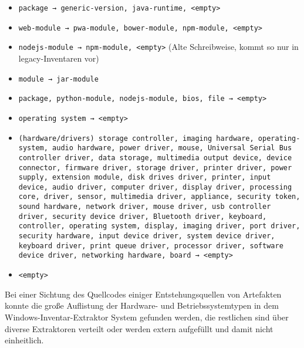 \begin{itemize}
    \itemsep0em

    \item \texttt{package → generic-version, java-runtime, <empty>}
    \item \texttt{web-module → pwa-module, bower-module, npm-module, <empty>}
    \item \texttt{nodejs-module → npm-module, <empty>} (Alte Schreibweise, kommt so nur in legacy-Inventaren vor)
    \item \texttt{module → jar-module}
    \item \texttt{package, python-module, nodejs-module, bios, file → <empty>}
    \item \texttt{operating system → <empty>}
    \item \texttt{(hardware/drivers) storage controller, imaging hardware, operating-system, audio hardware, power driver, mouse, Universal Serial Bus controller driver, data storage, multimedia output device, device connector, firmware driver, storage driver, printer driver, power supply, extension module, disk drives driver, printer, input device, audio driver, computer driver, display driver, processing core, driver, sensor, multimedia driver, appliance, security token, sound hardware, network driver, mouse driver, usb controller driver, security device driver, Bluetooth driver, keyboard, controller, operating system, display, imaging driver, port driver, security hardware, input device driver, system device driver, keyboard driver, print queue driver, processor driver, software device driver, networking hardware, board → <empty>}
    \item \texttt{<empty>}
\end{itemize}

Bei einer Sichtung des Quellcodes einiger Entstehungsquellen von Artefakten konnte die große Auflistung der Hardware- und Betriebssystemtypen in dem Windows-Inventar-Extraktor System gefunden werden, die restlichen sind über diverse Extraktoren verteilt oder werden extern aufgefüllt und damit nicht einheitlich.

